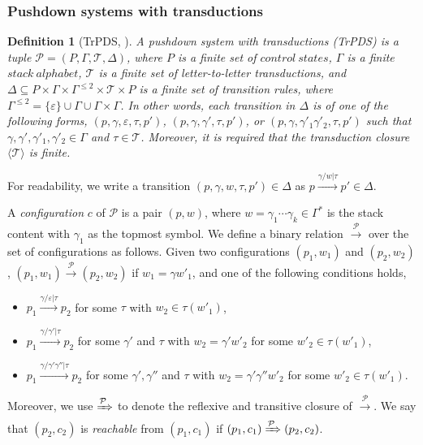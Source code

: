 \documentclass[preprint,12pt]{elsarticle}
\newtheorem{definition}{Definition}
\newcommand\Pp{{\mathcal{P} }}
\newcommand\TranSet{{\mathscr{T} }}
\newcommand{\TrPDS}{\textsf{TrPDS}}
\newcommand{\WOTrPDS}{\textsf{WPOTrPDS}}
\begin{document}
\subsubsection{Pushdown systems with transductions} \label{subsect:pushtrans}


\begin{definition}[\TrPDS, \cite{UM13,Song18}] \label{def:trpds}
    A \emph{pushdown system with transductions} (\TrPDS) is a tuple $\Pp = (P, \Gamma, \TranSet, \Delta)$, 
    where $P$ is a finite set of $control\ states$, $\Gamma$ is a finite $stack\ alphabet$, $\TranSet$ is a finite set of letter-to-letter transductions, and $\Delta \subseteq P \times \Gamma \times \Gamma^{\le 2} \times \TranSet \times P$ is a finite set of transition rules, where $\Gamma^{\le 2} = \{\varepsilon\} \cup \Gamma \cup \Gamma \times \Gamma$. In other words, each transition in $\Delta$ is of one of the following forms, $(p, \gamma, \varepsilon, \tau, p')$, $(p, \gamma, \gamma',\tau, p')$, or $(p, \gamma, \gamma'_1 \gamma'_2, \tau, p')$ such that $\gamma, \gamma', \gamma'_1, \gamma'_2 \in \Gamma$ and $\tau \in \TranSet$. 
   Moreover, it is required that the transduction closure $\langle \TranSet \rangle$ is finite.  
\end{definition}
For readability, we write a transition $(p, \gamma, w, \tau, p') \in \Delta$ as $p \xrightarrow{\gamma/w | \tau} p' \in \Delta$.

A \emph{configuration} $c$ of $\Pp$ is a pair $(p, w)$, where $w = \gamma_1 \cdots \gamma_k \in \Gamma^*$ is the  stack content with $\gamma_1$ as the topmost symbol. We define a binary relation $\xrightarrow{\Pp}$ over the set of configurations as follows. Given two configurations $(p_1, w_1)$ and $(p_2, w_2)$, $(p_1, w_1) \xrightarrow{\Pp} (p_2, w_2)$ if $w_1 = \gamma w'_1$, and one of the following conditions holds,
\begin{itemize}
\item $p_1 \xrightarrow{\gamma/\varepsilon|\tau} p_2$ for some $\tau$ with  $w_2 \in \tau(w'_1)$, 
%
\item $p_1 \xrightarrow{\gamma/\gamma'|\tau} p_2$ for some $\gamma'$ and $\tau$ with $w_2 = \gamma' w'_2$ for some $w'_2 \in \tau(w'_1)$, 
%
\item $p_1 \xrightarrow{\gamma/\gamma' \gamma''|\tau} p_2$ for some $\gamma', \gamma''$ and $\tau$ with $w_2 = \gamma' \gamma'' w'_2$ for some $w'_2 \in \tau(w'_1)$.
\end{itemize}
Moreover, we use $\xRightarrow{\Pp}$ to denote the reflexive and transitive closure of $\xrightarrow{\Pp}$. We say that $(p_2, c_2)$ is \emph{reachable} from $(p_1, c_1)$ if $(p_1, c_1) \xRightarrow{\Pp} (p_2, c_2)$.
\end{document}
